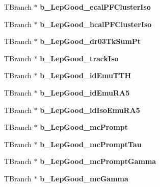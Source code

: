 \begin{DoxyCompactItemize}
T\+Branch $\ast$ {\bfseries b\+\_\+\+Lep\+Good\+\_\+ecal\+P\+F\+Cluster\+Iso}
\item 
\hypertarget{classMiniTree_a27330b171886a94edd8afb484f2ddac5}{}\label{classMiniTree_a27330b171886a94edd8afb484f2ddac5} 
T\+Branch $\ast$ {\bfseries b\+\_\+\+Lep\+Good\+\_\+hcal\+P\+F\+Cluster\+Iso}
\item 
\hypertarget{classMiniTree_ad1659554b307df72ccc85b9d1436d02f}{}\label{classMiniTree_ad1659554b307df72ccc85b9d1436d02f} 
T\+Branch $\ast$ {\bfseries b\+\_\+\+Lep\+Good\+\_\+dr03\+Tk\+Sum\+Pt}
\item 
\hypertarget{classMiniTree_a5550fda21272a4d164a0a6998594741e}{}\label{classMiniTree_a5550fda21272a4d164a0a6998594741e} 
T\+Branch $\ast$ {\bfseries b\+\_\+\+Lep\+Good\+\_\+track\+Iso}
\item 
\hypertarget{classMiniTree_a162890b0b5b918b31c6d48ce1ec09378}{}\label{classMiniTree_a162890b0b5b918b31c6d48ce1ec09378} 
T\+Branch $\ast$ {\bfseries b\+\_\+\+Lep\+Good\+\_\+id\+Emu\+T\+TH}
\item 
\hypertarget{classMiniTree_a11a6e31cbc815755a8bf1f2ae4880c65}{}\label{classMiniTree_a11a6e31cbc815755a8bf1f2ae4880c65} 
T\+Branch $\ast$ {\bfseries b\+\_\+\+Lep\+Good\+\_\+id\+Emu\+R\+A5}
\item 
\hypertarget{classMiniTree_a41b41d0f31df9e2fad6a9e65ee65473f}{}\label{classMiniTree_a41b41d0f31df9e2fad6a9e65ee65473f} 
T\+Branch $\ast$ {\bfseries b\+\_\+\+Lep\+Good\+\_\+id\+Iso\+Emu\+R\+A5}
\item 
\hypertarget{classMiniTree_aac0fc9c221caf06b6778d9f138eea733}{}\label{classMiniTree_aac0fc9c221caf06b6778d9f138eea733} 
T\+Branch $\ast$ {\bfseries b\+\_\+\+Lep\+Good\+\_\+mc\+Prompt}
\item 
\hypertarget{classMiniTree_a021fbfd8946b876382661512033d5ffa}{}\label{classMiniTree_a021fbfd8946b876382661512033d5ffa} 
T\+Branch $\ast$ {\bfseries b\+\_\+\+Lep\+Good\+\_\+mc\+Prompt\+Tau}
\item 
\hypertarget{classMiniTree_a2312b1357e337d3941abd341c5c89e69}{}\label{classMiniTree_a2312b1357e337d3941abd341c5c89e69} 
T\+Branch $\ast$ {\bfseries b\+\_\+\+Lep\+Good\+\_\+mc\+Prompt\+Gamma}
\item 
\hypertarget{classMiniTree_a76745c1e35569ee71a85327fbb314f42}{}\label{classMiniTree_a76745c1e35569ee71a85327fbb314f42} 
T\+Branch $\ast$ {\bfseries b\+\_\+\+Lep\+Good\+\_\+mc\+Gamma}
\item 
\hypertarget{classMiniTree_a6fcd734d7f5ddeb07772ec26bbecff57}{}\label{classMiniTree_a6fcd734d7f5ddeb07772ec26bbecff57} 

\end{DoxyCompactItemize}
